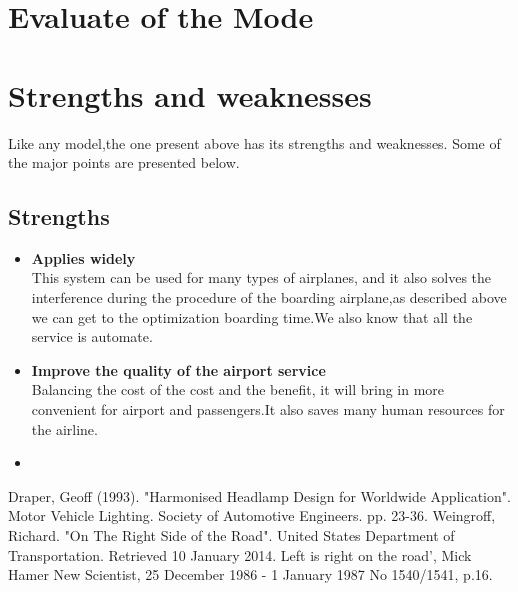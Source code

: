 \section{Evaluate of the Mode}

\section{Strengths and weaknesses}
Like any model,the one present above has its strengths and
weaknesses. Some of the major points are presented below.

\subsection{Strengths}
\begin{itemize}
\item \textbf{Applies widely}\\
This  system can be used for many types of airplanes, and it also
solves the interference during  the procedure of the boarding
airplane,as described above we can get to the  optimization
boarding time.We also know that all the service is automate.
\item \textbf{Improve the quality of the airport service}\\
Balancing the cost of the cost and the benefit, it will bring in
more convenient  for airport and passengers.It also saves many
human resources for the airline. \item \textbf{}
\end{itemize}




\begin{thebibliography}{99}
 Draper, Geoff (1993). "Harmonised 
Headlamp Design for Worldwide Application". Motor Vehicle 
Lighting. Society of Automotive Engineers. pp. 23-36.
 Weingroff, Richard. "On The 
Right Side of the Road". United States Department of 
Transportation. Retrieved 10 January 2014.
 Left is right on the road', Mick Hamer 
New Scientist, 25 December 1986 - 1 January 1987 No 1540/1541, 
p.16.
\end{thebibliography}
